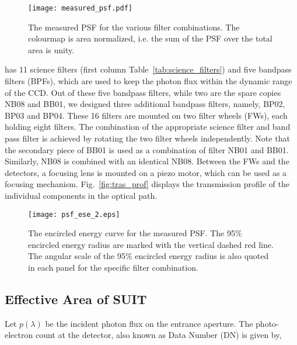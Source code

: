 \begin{figure*}
    \centering
    \texttt{[image: measured\_psf.pdf]}
    \caption{The measured PSF for the various filter combinations. The colourmap is area normalized, i.e. the sum of the PSF over the total area is unity.}
    \label{fig:psf_3d}
\end{figure*}

{\suit} has 11 science filters (first column Table~\ref{tab:science_filters}) and five bandpass filters (BPFs), which are used to keep the photon flux within the dynamic range of the CCD. Out of these five bandpass filters, while two are the spare copies NB08 and BB01, we designed three additional bandpass filters, namely, BP02, BP03 and BP04. These 16 filters are mounted on two filter wheels (FWs), each holding eight filters. The combination of the appropriate science filter and band pass filter is achieved by rotating the two filter wheels independently. Note that the secondary piece of BB01 is used as a combination of filter NB01 and BB01. Similarly, NB08 is combined with an identical NB08. Between the FWs and the detectors, a focusing lens is mounted on a piezo motor, which can be used as a focusing mechanism.  Fig.~\ref{fig:tras_prof} displays the transmission profile of the individual components in the optical path.

\begin{figure*}
    \centering
    \texttt{[image: psf\_ese\_2.eps]}
    \caption{The encircled energy curve for the measured PSF. The 95\% encircled energy radius are marked with the vertical dashed red line. The angular scale of the 95\% encircled energy radius is also quoted in each panel for the specific filter combination.}
    \label{fig:psf_ese}
\end{figure*}

\subsection{Effective Area of SUIT}\label{eff_area}
Let $p(\lambda)$ be the incident photon flux on the entrance aperture. The photo-electron count at the detector, also known as Data Number (DN) is given by,

